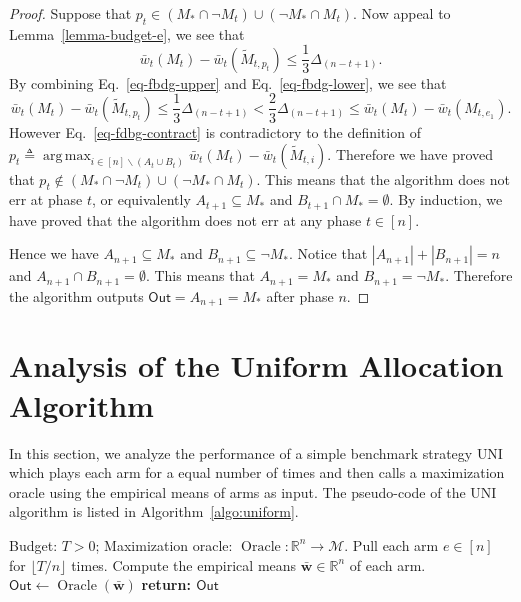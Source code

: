 \documentclass{article}
\newcommand{\Uniform}{{\small \textsf{UNI}}\xspace}
\newcommand{\M}{\mathcal M}
\newcommand{\del}{\backslash}
\newcommand{\RR}{\mathbb R}
\DeclareMathOperator*{\argmax}{arg\,max}
\DeclareMathOperator{\Oracle}{Oracle}
\newcommand{\out}{\mathsf{Out}}
\renewcommand{\vec}[1]{\boldsymbol{#1}}
\begin{document}
\begin{proof}
Suppose that $p_t \in (M_* \cap \neg M_t) \cup (\neg M_* \cap M_t)$.
Now appeal to Lemma~\ref{lemma-budget-e}, we see that
\begin{equation}
\label{eq-fbdg-lower}
\bar w_t(M_t) - \bar w_t(\tilde M_{t,p_t}) \le \frac{1}{3} \Delta_{(n-t+1)}.
\end{equation}
By combining Eq.~\eqref{eq-fbdg-upper} and Eq.~\eqref{eq-fbdg-lower}, we see that
\begin{equation}
\bar w_t(M_t) - \bar w_t(\tilde M_{t,p_t}) \le \frac{1}{3} \Delta_{(n-t+1)} < \frac{2}3 \Delta_{(n-t+1)} \le \bar w_t(M_t)- \bar w_t(M_{t,e_1}).
\label{eq-fdbg-contract}
\end{equation}
However Eq.~\eqref{eq-fdbg-contract} is contradictory to the definition of $p_t \triangleq \argmax_{i\in [n]\del (A_t\cup B_t)} \bar w_t(M_t)- \bar w_t(\tilde M_{t,i})$.
Therefore we have proved that $p_t \not\in (M_* \cap \neg M_t) \cup (\neg M_* \cap M_t)$.
This means that the algorithm does not err at phase $t$, or equivalently $A_{t+1} \subseteq M_*$ and $B_{t+1}\cap M_* = \emptyset$.
By induction, we have proved that the algorithm does not err at any phase $t\in[n]$.

Hence we have $A_{n+1} \subseteq M_*$ and $B_{n+1}\subseteq  \neg M_*$.
Notice that $|A_{n+1}| + |B_{n+1}| = n$ and $A_{n+1}\cap B_{n+1}=\emptyset$. This means that $A_{n+1} = M_*$ and $B_{n+1} = \neg M_*$.
Therefore the algorithm outputs $\out=A_{n+1}=M_*$ after phase $n$.
\end{proof}


\section{Analysis of the Uniform Allocation Algorithm}
\label{section:uniform}
In this section, we analyze the performance of a simple benchmark strategy \Uniform which plays each arm for a equal number of times and then calls a maximization oracle using the empirical means of arms as input.
The pseudo-code of the \Uniform algorithm is listed in Algorithm~\ref{algo:uniform}.

\begin{algorithm}[htbp]
{
\small
\begin{algorithmic}[1]
\Require Budget: $T>0$; Maximization oracle: $\Oracle: \RR^n \rightarrow \M$.
\State Pull each arm $e\in [n]$ for $\lfloor T/n\rfloor$ times.
\State Compute the empirical means $\vec {\bar w} \in \RR^n$ of each arm.
\State $\out \gets \Oracle(\vec {\bar w})$
\State \textbf{return: $\out$} 
\end{algorithmic}
\caption{\Uniform: Uniform Allocation}
\label{algo:uniform}
}
\end{algorithm}
\end{document}
